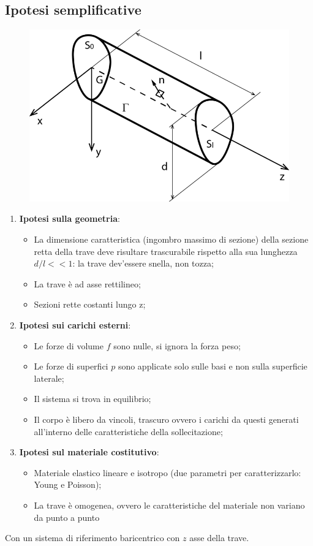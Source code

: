 \subsection{Ipotesi semplificative}
\begin{figure}[H]
	\centering
	\includegraphics[width=0.5\linewidth]{Immagini_2/screenshot001}
	\label{fig:screenshot001}
\end{figure}
	\begin{enumerate}
	\item \textbf{Ipotesi sulla geometria}:
		\begin{itemize}		
		\item La dimensione caratteristica (ingombro massimo di sezione) della sezione retta della trave
		deve risultare trascurabile rispetto alla sua lunghezza $ d/l<<1 $: la trave dev'essere snella, non tozza;
		\item La trave è ad asse rettilineo;
		\item Sezioni rette costanti lungo z;
		\end{itemize}

	\item \textbf{Ipotesi sui carichi esterni}:
		\begin{itemize}
			\item  Le forze di volume $ f $ sono nulle, si ignora la forza peso;
		\item Le forze di superfici	$ p $ sono applicate solo sulle basi e non sulla superficie laterale;
		\item Il sistema si trova in equilibrio;
		\item Il corpo è libero da vincoli, trascuro ovvero i carichi da questi generati all'interno delle caratteristiche della sollecitazione;
		\end{itemize}
	\item \textbf{Ipotesi sul materiale costitutivo}:
		\begin{itemize}
			\item Materiale elastico lineare e isotropo (due parametri per caratterizzarlo: Young e Poisson);
		\item La trave è omogenea, ovvero le caratteristiche del	materiale non variano da punto a punto
		\end{itemize}
	\end{enumerate}
	Con un sistema di riferimento baricentrico con $z$ asse della trave. \newline 
	
